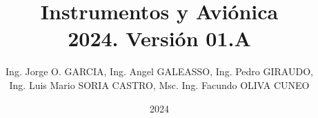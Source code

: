 \documentclass[a4page,12pt,twoside, spanish]{book}
\title{Instrumentos y Avi\'onica \\ 2024. Versi\'on 01.A}
\author{Ing. Jorge O. GARCIA, Ing. Angel GALEASSO, Ing. Pedro GIRAUDO,
       \\ Ing. Luis Mario SORIA CASTRO,
        Msc. Ing. Facundo OLIVA CUNEO}
\date{2024}
\begin{document}
\renewcommand{\listtablename}{\'Indice de tablas} 
\renewcommand{\tablename}{Tabla}  %

\renewcommand{\appendixtocname}{Ap\'endices}
\renewcommand{\appendixpagename}{Ap\'endices}

\renewcommand{\baselinestretch}{1.5}       %

\setlength{\parindent}{0pt}      %

\clearpage
\thispagestyle{fancy}

\maketitle

\tableofcontents





















\clearpage	%
\printacronyms[name = Acr\'onimos, heading = chapter*]


\clearpage
\printglossaries	%

\clearpage


\clearpage
\renewcommand\bibname{Bibliograf\'ia} %



%


%
%

\begin{appendices}

%
%

\end{appendices}
\end{document}

